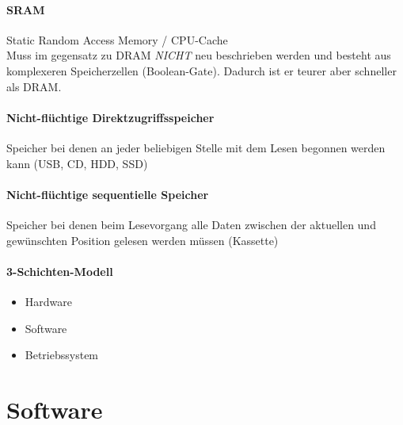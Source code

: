 \documentclass[twocolumn]{article}
\begin{document}
\paragraph{SRAM}
	Static Random Access Memory / CPU-Cache \\
	Muss im gegensatz zu DRAM \textit{NICHT} neu beschrieben werden und besteht aus komplexeren Speicherzellen (Boolean-Gate). Dadurch ist er teurer aber schneller als DRAM.

\paragraph{Nicht-flüchtige Direktzugriffsspeicher}
	Speicher bei denen an jeder beliebigen Stelle mit dem Lesen begonnen werden kann (USB, CD, HDD, SSD)

\paragraph{Nicht-flüchtige sequentielle Speicher}
	Speicher bei denen beim Lesevorgang alle Daten zwischen der aktuellen und gewünschten Position gelesen werden müssen (Kassette)

\paragraph{3-Schichten-Modell}
\begin{itemize}
	\item Hardware
	\item Software 
	\item Betriebssystem
\end{itemize}

\section{Software}
\end{document}
